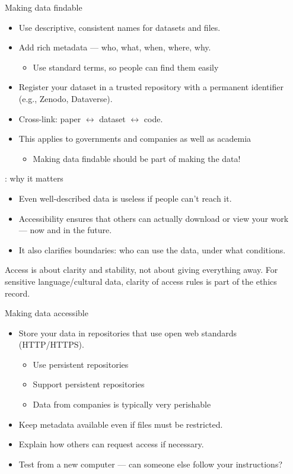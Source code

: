 \documentclass[aspectratio=169]{beamer}
\begin{document}
\begin{frame}{Making data findable}
\begin{itemize}
  \item Use descriptive, consistent names for datasets and files.  
  \item Add rich metadata — who, what, when, where, why.
    \begin{itemize}
    \item Use standard terms, so people can find them easily
    \end{itemize}
  \item Register your dataset in a trusted repository with a permanent identifier (e.g., Zenodo, Dataverse).  
  \item Cross-link: paper $\leftrightarrow$ dataset $\leftrightarrow$ code.
  \item This applies to governments and companies as well as academia
    \begin{itemize}
    \item Making data findable should be part of making the data!
    \end{itemize}
\end{itemize}
\end{frame}

\begin{frame}{: why it matters}
\begin{itemize}
  \item Even well-described data is useless if people can’t reach it.  
  \item Accessibility ensures that others can actually download or view your work \\ — now and in the future.  
  \item It also clarifies boundaries: who can use the data, under what conditions.
\end{itemize}
\medskip
Access is about clarity and stability, not about giving everything away.  For sensitive language/cultural data, clarity of access rules is part of the ethics record.
\end{frame}

\begin{frame}{Making data accessible}
\begin{itemize}
  \item Store your data in repositories that use open web standards (HTTP/HTTPS).  
    \begin{itemize}
    \item Use persistent repositories 
    \item Support persistent repositories
    \item Data from companies is typically very perishable
    \end{itemize}
  \item Keep metadata available even if files must be restricted.  
  \item Explain how others can request access if necessary.  
  \item Test from a new computer — can someone else follow your instructions?
\end{itemize}
\end{frame}
\end{document}
